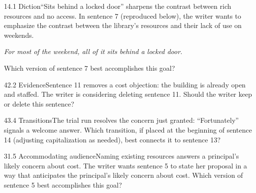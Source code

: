 \documentclass[11pt]{article}
\begin{document}
\begin{q}{1}{4.1 Diction}{``Sits behind a locked door'' sharpens the contrast between rich resources and no access.}
In sentence 7 (reproduced below), the writer wants to emphasize the contrast between the library's resources and their lack of use on weekends.

\emph{For most of the weekend, all of it sits behind a locked door.}

Which version of sentence 7 best accomplishes this goal?
\end{q}

\begin{q}{4}{2.2 Evidence}{Sentence 11 removes a cost objection: the building is already open and staffed.}
The writer is considering deleting sentence 11. Should the writer keep or delete this sentence?
\end{q}

\begin{q}{4}{3.4 Transitions}{The trial run resolves the concern just granted: ``Fortunately'' signals a welcome answer.}
Which transition, if placed at the beginning of sentence 14 (adjusting capitalization as needed), best connects it to sentence 13?
\end{q}

\begin{q}{3}{1.5 Accommodating audience}{Naming existing resources answers a principal's likely concern about cost.}
The writer wants sentence 5 to state her proposal in a way that anticipates the principal's likely concern about cost. Which version of sentence 5 best accomplishes this goal?
\end{q}
\end{document}
